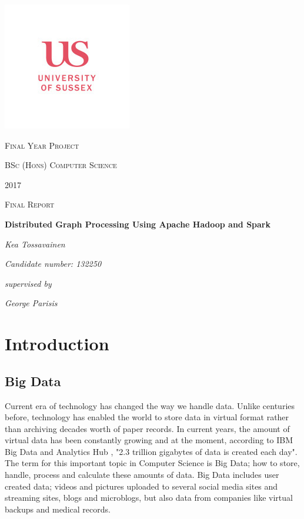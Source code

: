 \documentclass{article}
\theoremstyle{definition}
\begin{document}


\begin{titlepage}
	\centering
	\includegraphics{sussex} \par
	{\scshape\Large Final Year Project \par}
	{\Large\scshape BSc (Hons) Computer Science\par}
	{\Large\scshape 2017\par}
	{\scshape\Large Final Report\par}
	\vspace{1cm}
	{\huge\bfseries Distributed Graph Processing Using Apache Hadoop and Spark\par}
	\vspace{1cm}
	{\Large\itshape Kea Tossavainen \par}
	{\Large\itshape Candidate number: 132250\par}
	\vfill
	{\Large\itshape supervised by\par}
	{\Large\itshape George Parisis\par}

	\vfill
\end{titlepage}


\tableofcontents

\newpage
\section{Introduction}

\subsection{Big Data}
Current era of technology has changed the way we handle data. Unlike centuries before, technology has enabled the world to store data in virtual format rather than archiving decades worth of paper records. In current years, the amount of virtual data has been constantly growing and at the moment, according to IBM Big Data and Analytics Hub \cite{ibm}, "2.3 trillion gigabytes of data is created each day". The term for this important topic in Computer Science is Big Data; how to store, handle, process and calculate these amounts of data. Big Data includes user created data; videos and pictures uploaded to several social media sites and streaming sites, blogs and microblogs, but also data from companies like virtual backups and medical records. \\
\end{document}
